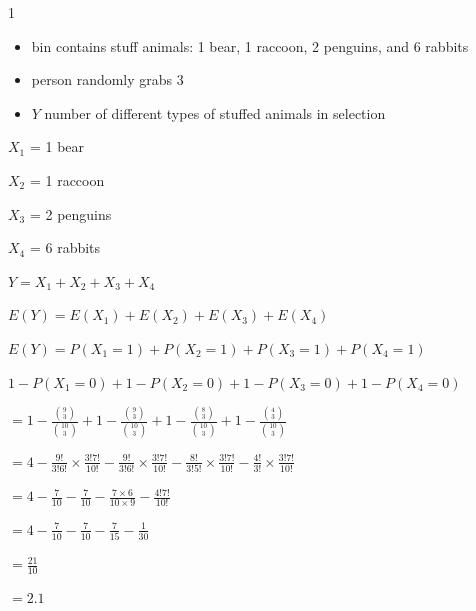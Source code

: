 \documentclass[12 pt]{article}
\begin{document}
    \begin{exercise}{1}
    \hfill

    \begin{itemize}
        \item bin contains stuff animals: 1 bear, 1 raccoon, 2 penguins, and 6 rabbits
        \item person randomly grabs 3
        \item $Y$ number of different types of stuffed animals in selection
    \end{itemize}

    \hfill

    $X_1$ = 1 bear

    $X_2$ = 1 raccoon

    $X_3$ = 2 penguins

    $X_4$ = 6 rabbits

    \hfill

    $Y = X_1 + X_2 +X_3 + X_4$

    $E(Y) = E(X_1) + E(X_2) + E(X_3) + E(X_4)$

    $E(Y) = P(X_1 = 1) + P(X_2 = 1) + P(X_3 = 1) + P(X_4 = 1)$

    $1 - P(X_1 = 0) + 1 - P(X_2 = 0) + 1 - P(X_3 = 0) + 1 - P(X_4 = 0)$

    $= 1 - \frac{\binom{9}{3}}{\binom{10}{3}} + 1  - \frac{\binom{9}{3}}{\binom{10}{3}} + 1 - \frac{\binom{8}{3}}{\binom{10}{3}} + 1 - \frac{\binom{4}{3}}{\binom{10}{3}}$

    $= 4 - \frac{9!}{3!6!} \times \frac{3!7!}{10!} - \frac{9!}{3!6!} \times \frac{3!7!}{10!} - \frac{8!}{3!5!} \times \frac{3!7!}{10!} - \frac{4!}{3!} \times \frac{3!7!}{10!}$

    $= 4 - \frac{7}{10} - \frac{7}{10} - \frac{7 \times 6}{10 \times 9} - \frac{4!7!}{10!}$

    $= 4 - \frac{7}{10} - \frac{7}{10} - \frac{7}{15} - \frac{1}{30}$

    $= \frac{21}{10}$
    
    $= 2.1$

    \hfill   
    \end{exercise}
\end{document}
